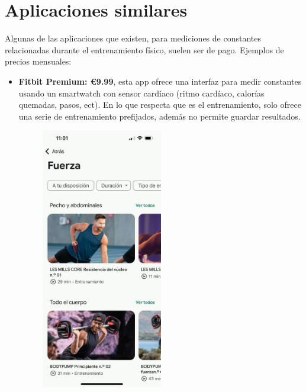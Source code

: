 
\section{Aplicaciones similares}

Algunas de las aplicaciones que existen, para mediciones de constantes relacionadas durante el entrenamiento físico, suelen ser de pago. Ejemplos de precios mensuales:

\begin{itemize}
	\item \textbf{Fitbit Premium: €9.99}, esta app ofrece una interfaz para medir constantes usando un smartwatch con sensor cardíaco (ritmo cardíaco, calorías quemadas, pasos, ect). En lo que respecta que es el entrenamiento, solo ofrece una serie de entrenamiento prefijados, además no permite guardar resultados.
\begin{figure}[H]
   \centering
    \includegraphics[width=0.5\textwidth]{fotos/fitbit.jpeg}

\end{figure}
\end{itemize}
